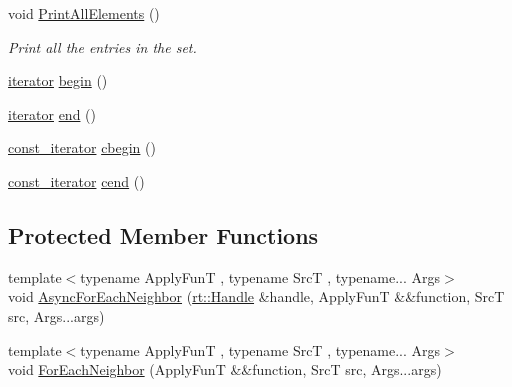 \begin{DoxyCompactItemize}
void \hyperlink{classshad_1_1LocalSet_a81d5e14f5673441a23499b0c6935d5f3}{Print\-All\-Elements} ()
\begin{DoxyCompactList}\small\item\em Print all the entries in the set. \end{DoxyCompactList}\item 
\hyperlink{classshad_1_1LocalSet_aea5fcaed21331e4dcb23811bc3f59e0d}{iterator} \hyperlink{classshad_1_1LocalSet_a5a65d59343c4636fef46da660b2a7eb6}{begin} ()
\item 
\hyperlink{classshad_1_1LocalSet_aea5fcaed21331e4dcb23811bc3f59e0d}{iterator} \hyperlink{classshad_1_1LocalSet_a53dc0f1dc7b515f9cf555e781a933bd2}{end} ()
\item 
\hyperlink{classshad_1_1LocalSet_a3a1104a2552f91dcdf37b057440ba182}{const\-\_\-iterator} \hyperlink{classshad_1_1LocalSet_a695b93811d46a8022840ee42ed91b6e5}{cbegin} ()
\item 
\hyperlink{classshad_1_1LocalSet_a3a1104a2552f91dcdf37b057440ba182}{const\-\_\-iterator} \hyperlink{classshad_1_1LocalSet_a09f7a121d6f471e9ab780885af3dd000}{cend} ()
\end{DoxyCompactItemize}
\subsection*{Protected Member Functions}
\begin{DoxyCompactItemize}
\item 
{\footnotesize template$<$typename Apply\-Fun\-T , typename Src\-T , typename... Args$>$ }\\void \hyperlink{classshad_1_1LocalSet_a482dc96490e50af9910889454537c236}{Async\-For\-Each\-Neighbor} (\hyperlink{classshad_1_1rt_1_1Handle}{rt\-::\-Handle} \&handle, Apply\-Fun\-T \&\&function, Src\-T src, Args...\-args)
\item 
{\footnotesize template$<$typename Apply\-Fun\-T , typename Src\-T , typename... Args$>$ }\\void \hyperlink{classshad_1_1LocalSet_a2b9339aab76b1cfa1a31e6f68efc93b6}{For\-Each\-Neighbor} (Apply\-Fun\-T \&\&function, Src\-T src, Args...\-args)
\end{DoxyCompactItemize}
